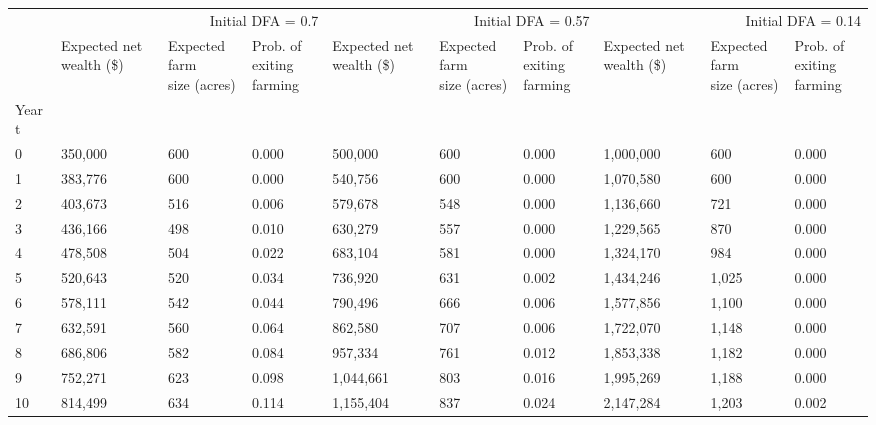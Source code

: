 \begin{tabular}{llllllllll}
\toprule
 & \multicolumn{3}{r}{Initial DFA = 0.7} & \multicolumn{3}{r}{Initial DFA = 0.57} & \multicolumn{3}{r}{Initial DFA = 0.14} \\
 & \makecell{Expected net\\wealth (\$)} & \makecell{Expected farm\\size (acres)} & \makecell{Prob. of exiting\\farming} & \makecell{Expected net\\wealth (\$)} & \makecell{Expected farm\\size (acres)} & \makecell{Prob. of exiting\\farming} & \makecell{Expected net\\wealth (\$)} & \makecell{Expected farm\\size (acres)} & \makecell{Prob. of exiting\\farming} \\
Year t &  &  &  &  &  &  &  &  &  \\
\midrule
0 & 350,000 & 600 & 0.000 & 500,000 & 600 & 0.000 & 1,000,000 & 600 & 0.000 \\
1 & 383,776 & 600 & 0.000 & 540,756 & 600 & 0.000 & 1,070,580 & 600 & 0.000 \\
2 & 403,673 & 516 & 0.006 & 579,678 & 548 & 0.000 & 1,136,660 & 721 & 0.000 \\
3 & 436,166 & 498 & 0.010 & 630,279 & 557 & 0.000 & 1,229,565 & 870 & 0.000 \\
4 & 478,508 & 504 & 0.022 & 683,104 & 581 & 0.000 & 1,324,170 & 984 & 0.000 \\
5 & 520,643 & 520 & 0.034 & 736,920 & 631 & 0.002 & 1,434,246 & 1,025 & 0.000 \\
6 & 578,111 & 542 & 0.044 & 790,496 & 666 & 0.006 & 1,577,856 & 1,100 & 0.000 \\
7 & 632,591 & 560 & 0.064 & 862,580 & 707 & 0.006 & 1,722,070 & 1,148 & 0.000 \\
8 & 686,806 & 582 & 0.084 & 957,334 & 761 & 0.012 & 1,853,338 & 1,182 & 0.000 \\
9 & 752,271 & 623 & 0.098 & 1,044,661 & 803 & 0.016 & 1,995,269 & 1,188 & 0.000 \\
10 & 814,499 & 634 & 0.114 & 1,155,404 & 837 & 0.024 & 2,147,284 & 1,203 & 0.002 \\
\bottomrule
\end{tabular}
